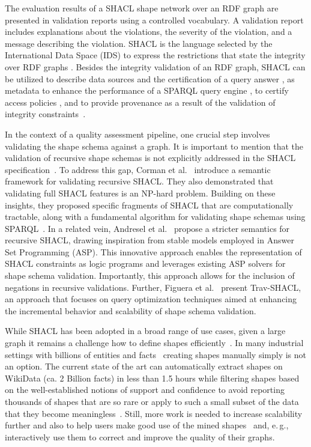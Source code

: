 \documentclass[a4paper,USenglish]{tgdk-v2021}
\begin{document}
The evaluation results of a SHACL shape network over an RDF graph are presented in validation reports using a controlled vocabulary. A validation report includes explanations about the violations, the severity of the violation, and a message describing the violation. SHACL is the language selected by the International Data Space (IDS) to express the restrictions that state the integrity over RDF graphs \cite{DBLP:books/sp/22/0002LB22}. Besides the integrity validation of an RDF graph, SHACL can be utilized 
to describe data sources and the certification of a query answer \cite{DBLP:conf/vldb/Rohde21},
as metadata to enhance the performance of a SPARQL query engine \cite{DBLP:conf/edbt/RabbaniLH21},
to certify access policies \cite{DBLP:conf/esws/RohdeV23}, and 
to provide provenance as a result of the validation of integrity constraints~\cite{DBLP:conf/edbt/DelvaDJB23}. 

In the context of a quality assessment pipeline, one crucial step involves validating the shape schema against a graph. It is important to mention that the validation of recursive shape schemas is not explicitly addressed in the SHACL specification~\cite{SHACL}. 
To address this gap, Corman et al.~\cite{Corman2018} introduce a semantic framework for validating recursive SHACL. They also demonstrated that validating full SHACL features is an NP-hard problem. Building on these insights, they proposed specific fragments of SHACL that are computationally tractable, along with a fundamental algorithm for validating shape schemas using SPARQL~\cite{Corman2019}.
In a related vein, Andresel et al.~\cite{Andresel2020} propose a stricter semantics for recursive SHACL, drawing inspiration from stable models employed in Answer Set Programming (ASP). This innovative approach enables the representation of SHACL constraints as logic programs and leverages existing ASP solvers for shape schema validation. Importantly, this approach allows for the inclusion of negations in recursive validations. Further, Figuera et al.~\cite{DBLP:conf/www/FigueraRV21} present Trav-SHACL, an approach that focuses on query optimization techniques aimed at enhancing the incremental behavior and scalability of shape schema validation.

While SHACL has been adopted in a broad range of use cases, given a large graph it remains a challenge how to define shapes efficiently~\cite{DBLP:conf/www/RabbaniLH22}.
In many industrial settings with billions of entities and facts~\cite{Noy19} creating shapes manually simply is not an option. 
The current state of the art can automatically extract shapes on WikiData (ca. 2 Billion facts) in less than 1.5 hours while filtering shapes based on the well-established notions of support and confidence to avoid reporting thousands of shapes that are so rare or apply to such a small subset of the data that they become meaningless~\cite{DBLP:journals/pvldb/RabbaniLH23}.
Still, more work is needed to increase scalability further and also to help users make good use of the mined shapes~\cite{DBLP:conf/sigmod/RabbaniLH23} and, e.\,g., interactively use them to correct and improve the quality of their graphs.
\end{document}
